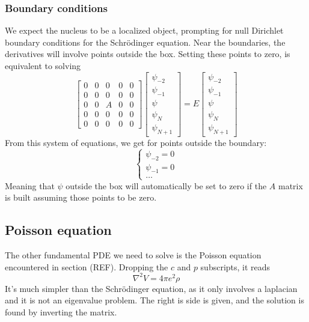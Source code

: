 \subsubsection{Boundary conditions}
We expect the nucleus to be a localized object, prompting for null Dirichlet boundary conditions for the Schr\"odinger equation.
Near the boundaries, the derivatives will involve points outside the box. Setting these points to zero, is equivalent to solving 
\begin{equation}
    \begin{bmatrix}
        0 & 0 & 0 & 0 & 0
        \\0 & 0 & 0 & 0 & 0
        \\0 & 0 & A & 0 & 0
        \\0 & 0 & 0 & 0 & 0
        \\0 & 0 & 0 & 0 & 0
    \end{bmatrix}
    \begin{bmatrix}
        \psi_{-2}\\\psi_{-1}\\\psi\\\psi_{N}\\ \psi_{N+1} 
    \end{bmatrix}
    = E 
    \begin{bmatrix}
        \psi_{-2}\\\psi_{-1}\\\psi\\\psi_{N}\\ \psi_{N+1} 
    \end{bmatrix}
\end{equation}
From this system of equations, we get for points outside the boundary:
\begin{equation}
    \begin{cases}
        \psi_{-2} = 0\\
        \psi_{-1} = 0\\
        \ldots
    \end{cases}
\end{equation}
Meaning that $\psi$ outside the box will automatically be set to zero if the $A$ matrix is built assuming those points to be zero.
\subsection{Poisson equation}
\label{subsec:poisson}
The other fundamental PDE we need to solve is the Poisson equation encountered in section (REF). Dropping the $c$ and $p$ subscripts, it reads
\begin{equation*}
\nabla^2 V = 4\pi e^2 \rho
\end{equation*}
It's much simpler than the Schr\"odinger equation, as it only involves a laplacian and it is not an eigenvalue problem. The right is side is given, and the solution is found by inverting the matrix.
